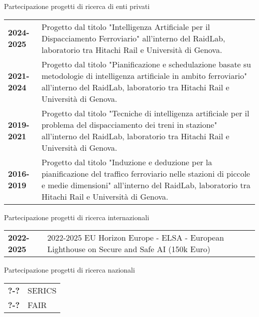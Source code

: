 \documentclass{resume} %
\begin{document}
\begin{rSection}{Partecipazione progetti di ricerca di enti privati}
	\begin{tabularx}{0.95\textwidth} {lp{14cm}}
 	\textbf{2024-2025} & Progetto dal titolo "Intelligenza Artificiale per il Dispacciamento Ferroviario" all'interno del RaidLab, laboratorio tra Hitachi Rail e Università di Genova. \\
  	\textbf{2021-2024} & Progetto dal titolo "Pianificazione e schedulazione basate su metodologie di intelligenza artificiale in ambito ferroviario" all'interno del RaidLab, laboratorio tra Hitachi Rail e Università di Genova. \\
   	\textbf{2019-2021} & Progetto dal titolo "Tecniche di intelligenza artificiale per il problema del dispacciamento dei treni in stazione" all'interno del RaidLab, laboratorio tra Hitachi Rail e Università di Genova.\\
    \textbf{2016-2019} & Progetto dal titolo "Induzione e deduzione per la pianificazione del traffico ferroviario nelle stazioni di piccole e medie dimensioni" all'interno del RaidLab, laboratorio tra Hitachi Rail e Università di Genova.\\
 \end{tabularx}
\end{rSection}

\begin{rSection}{Partecipazione progetti di ricerca internazionali}
	\begin{tabularx}{0.95\textwidth} {lp{14cm}}
 \textbf{2022-2025} & 2022-2025	EU Horizon Europe - ELSA - European Lighthouse on Secure and Safe	AI (150k Euro)
 \end{tabularx}
\end{rSection}

\begin{rSection}{Partecipazione progetti di ricerca nazionali}
	\begin{tabularx}{0.95\textwidth} {lp{14cm}}
 \textbf{?-?} & SERICS\\
  \textbf{?-?} & FAIR\\
 \end{tabularx}
\end{rSection}
\end{document}
